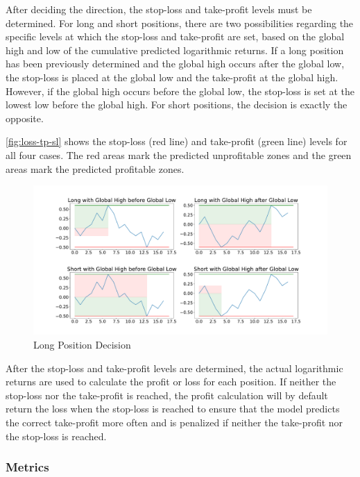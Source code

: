 \noindent
After deciding the direction, the stop-loss and take-profit levels must be determined.
For long and short positions, there are two possibilities regarding the specific levels at which the stop-loss and take-profit are set, based on the global high and low of the cumulative predicted logarithmic returns.
If a long position has been previously determined and the global high occurs after the global low, the stop-loss is placed at the global low and the take-profit at the global high.
However, if the global high occurs before the global low, the stop-loss is set at the lowest low before the global high.
For short positions, the decision is exactly the opposite.

\autoref{fig:loss-tp-sl} shows the stop-loss (red line) and take-profit (green line) levels for all four cases.
The red areas mark the predicted unprofitable zones and the green areas mark the predicted profitable zones.

\begin{figure}[H]
    \centering
    \includegraphics[width=\textwidth]{images/models/loss_tp_sl}
    \caption{Long Position Decision}
    \label{fig:loss-tp-sl}
\end{figure}

\noindent
After the stop-loss and take-profit levels are determined, the actual logarithmic returns are used to calculate the profit or loss for each position.
If neither the stop-loss nor the take-profit is reached, the profit calculation will by default return the loss when the stop-loss is reached to ensure that the model predicts the correct take-profit more often and is penalized if neither the take-profit nor the stop-loss is reached.

\subsubsection{Metrics}

